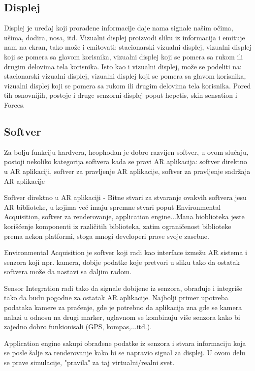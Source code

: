 \documentclass[a4paper]{article}
\begin{document}
	\subsection{Displej}
    \label{sec:Displej}
	Displej je uređaj koji prorađene informacije daje nama signale našim očima, ušima, dodira, nosa, itd. Vizualni displej proizvodi sliku iz informacija i emituje nam na ekran, tako može i emitovati:  stacionarski vizualni displej, vizualni displej koji se pomera sa glavom korisnika, vizualni displej koji se pomera sa rukom ili drugim delovima tela korisnika.
	Isto kao i vizualni displej, može se podeliti na: stacionarski vizualni displej, vizualni displej koji se pomera sa glavom korisnika, vizualni displej koji se pomera sa rukom ili drugim delovima tela korisnika. 
	Pored tih osnovnijih, postoje i druge senzorni displej poput hepctis, skin sensation i Forces.
	\subsection{Softver}
        \label{sec:Softver}
        Za bolju funkciju hardvera, heophodan je dobro razvijen softver, u ovom slučaju, postoji nekoliko kategorija softvera kada se pravi AR aplikacija: softver
	direktno u AR aplikaciji, softver za pravljenje AR aplikacije, softver za pravljenje sadržaja AR aplikacije
        
	Softver direktno u AR aplikaciji - Bitne stvari za stvaranje ovakvih softvera jesu AR biblioteke, u kojima već imaju spremne stvari poput Environmental
	Acquisition, softver za renderovanje, application engine...Mana bioblioteka jeste korišćenje komponenti iz različitih biblioteka, zatim ograničenost biblioteke
	prema nekon platformi, stoga mnogi developeri prave svoje zasebne.

	Environmental Acquisition je softver koji radi kao interface izmežu AR sistema i senzora koji npr. kamera, dobije podatke koje pretvori u sliku tako da ostatak
	softvera može da nastavi sa daljim radom.

	Sensor Integration radi tako da signale dobijene iz senzora, obrađuje i integriše tako da budu pogodne za ostatak AR aplikacije. Najbolji primer upotreba
	podataka kamere za praćenje, gde je potrebno da aplikacija zna gde se kamera nalazi u odnosu na drugi marker, uglavnom se kombinuju više senzora kako bi
	zajedno dobro funkionisali (GPS, kompas,...itd.).

	Application engine sakupi obrađene podatke iz senzora i stvara informaciju koja se posle šalje za renderovanje kako bi se napravio signal za displej. U ovom 
	delu se prave simulacije, "pravila" za taj virtualni/realni svet.
\end{document}
